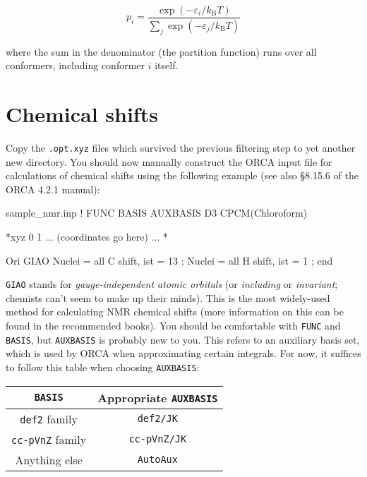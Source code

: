\documentclass[10pt]{article}
\begin{document}
\[ p_i = \frac{\exp(-\varepsilon_i/k_\mathrm{B}T)}{\sum_j \exp(-\varepsilon_j/k_\mathrm{B}T)} \]

where the sum in the denominator (the partition function) runs over all conformers, including conformer \(i\) itself.

\newpage

\section{Chemical shifts}

Copy the \texttt{.opt.xyz} files which survived the previous filtering step to yet another new directory. You should now manually construct the ORCA input file for calculations of chemical shifts using the following example (see also \S8.15.6 of the ORCA 4.2.1 manual):

\begin{script}{sample\_nmr.inp}
! FUNC BASIS AUXBASIS D3 CPCM(Chloroform)


*xyz 0 1
... (coordinates go here) ...
*

  Ori GIAO
  Nuclei = all C { shift, ist = 13 };
  Nuclei = all H { shift, ist = 1 };
end
\end{script}

\texttt{GIAO} stands for \textit{gauge-independent atomic orbitals} (or \textit{including} or \textit{invariant}; chemists can't seem to make up their minds). This is the most widely-used method for calculating NMR chemical shifts (more information on this can be found in the recommended books). You should be comfortable with \texttt{FUNC} and \texttt{BASIS}, but \texttt{AUXBASIS} is probably new to you. This refers to an auxiliary basis set, which is used by ORCA when approximating certain integrals. For now, it suffices to follow this table when choosing \texttt{AUXBASIS}:

\begin{center}
    \begin{tabular}{cc}
        \toprule
        \texttt{BASIS} & Appropriate \texttt{AUXBASIS} \\ \midrule
        \texttt{def2} family & \texttt{def2/JK} \\
        \texttt{cc-pVnZ} family & \texttt{cc-pVnZ/JK} \\
        Anything else & \texttt{AutoAux} \\
        \bottomrule
    \end{tabular}
\end{center}
\end{document}
